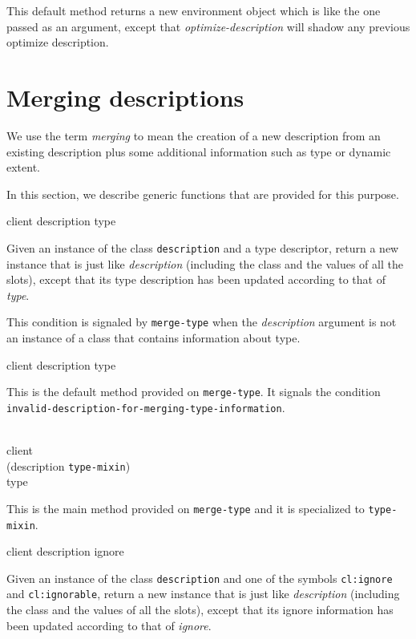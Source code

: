 This default method returns a new environment object which is like the
one passed as an argument, except that \textit{optimize-description}
will shadow any previous optimize description.

\section{Merging descriptions}

We use the term \emph{merging} to mean the creation of a new
description from an existing description plus some
additional information such as type or dynamic extent.

In this section, we describe generic functions that are provided for
this purpose.

{\footnotesize
{} {client description type}
}

Given an instance of the class \texttt{description} and a
type descriptor, return a new instance that is just like
\textit{description} (including the class and the values of
all the slots), except that its type description has been updated
according to that of \textit{type}.

{\footnotesize
{}
}

This condition is signaled by \texttt{merge-type} when the
\textit{description} argument is not an instance of a class that
contains information about type.

{\footnotesize
{} {client description type}
}

This is the default method provided on \texttt{merge-type}.  It
signals the condition
\texttt{invalid-description-for-merging-type-information}.

{\footnotesize
{}\\
           {client\\
            (description {\tt type-mixin})\\
            type}
}

This is the main method provided on \texttt{merge-type}
and it is specialized to \texttt{type-mixin}.

{\footnotesize
{} {client description ignore}
}

Given an instance of the class \texttt{description} and one
of the symbols \texttt{cl:ignore} and \texttt{cl:ignorable},
return a new instance that is just like
\textit{description} (including the class and the values of
all the slots), except that its ignore information has been updated
according to that of \textit{ignore}.


